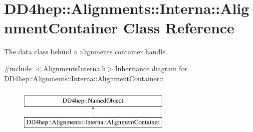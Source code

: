 \hypertarget{class_d_d4hep_1_1_alignments_1_1_interna_1_1_alignment_container}{
\section{DD4hep::Alignments::Interna::AlignmentContainer Class Reference}
\label{class_d_d4hep_1_1_alignments_1_1_interna_1_1_alignment_container}
}


The data class behind a alignments container handle.  


{\ttfamily \#include $<$AlignmentsInterna.h$>$}Inheritance diagram for DD4hep::Alignments::Interna::AlignmentContainer::\begin{figure}[H]
\begin{center}
\leavevmode
\includegraphics[height=2cm]{class_d_d4hep_1_1_alignments_1_1_interna_1_1_alignment_container}
\end{center}
\end{figure}
